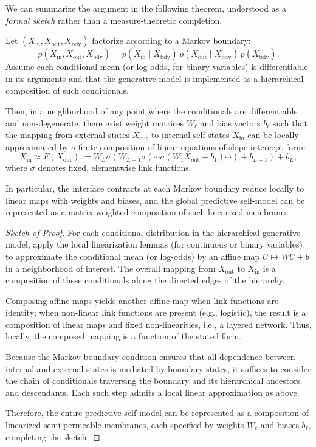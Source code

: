\documentclass[11pt,letterpaper]{article}
\begin{document}
We can summarize the argument in the following theorem, understood as a \emph{formal sketch} rather than a measure-theoretic completion.

\begin{theorem}
Let $(X_{\text{in}}, X_{\text{out}}, X_{\text{bdy}})$ factorize according to a Markov boundary:
\[
p(X_{\text{in}}, X_{\text{out}}, X_{\text{bdy}})
= p(X_{\text{in}} \mid X_{\text{bdy}})\, p(X_{\text{out}} \mid X_{\text{bdy}})\, p(X_{\text{bdy}}).
\]
Assume each conditional mean (or log-odds, for binary variables) is differentiable in its arguments and that the generative model is implemented as a hierarchical composition of such conditionals.

Then, in a neighborhood of any point where the conditionals are differentiable and non-degenerate, there exist weight matrices $W_\ell$ and bias vectors $b_\ell$ such that the mapping from external states $X_{\text{out}}$ to internal self states $X_{\text{in}}$ can be locally approximated by a finite composition of linear equations of slope-intercept form:
\[
X_{\text{in}} \approx F(X_{\text{out}}) := W_L \sigma(W_{L-1} \sigma(\cdots \sigma(W_1 X_{\text{out}} + b_1) \cdots ) + b_{L-1}) + b_L,
\]
where $\sigma$ denotes fixed, elementwise link functions.

In particular, the interface contracts at each Markov boundary reduce locally to linear maps with weights and biases, and the global predictive self-model can be represented as a matrix-weighted composition of such linearized membranes.
\end{theorem}

\begin{proof}[Sketch of Proof]
For each conditional distribution in the hierarchical generative model, apply the local linearization lemmas (for continuous or binary variables) to approximate the conditional mean (or log-odds) by an affine map $U \mapsto W U + b$ in a neighborhood of interest. The overall mapping from $X_{\text{out}}$ to $X_{\text{in}}$ is a composition of these conditionals along the directed edges of the hierarchy.

Composing affine maps yields another affine map when link functions are identity; when non-linear link functions are present (e.g., logistic), the result is a composition of linear maps and fixed non-linearities, i.e., a layered network. Thus, locally, the composed mapping is a function of the stated form.

Because the Markov boundary condition ensures that all dependence between internal and external states is mediated by boundary states, it suffices to consider the chain of conditionals traversing the boundary and its hierarchical ancestors and descendants. Each such step admits a local linear approximation as above.

Therefore, the entire predictive self-model can be represented as a composition of linearized semi-permeable membranes, each specified by weights $W_\ell$ and biases $b_\ell$, completing the sketch.
\end{proof}
\end{document}
